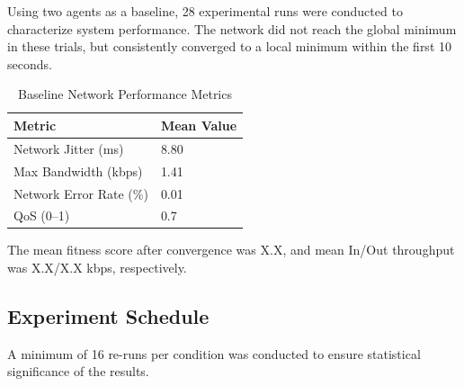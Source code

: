 \documentclass[conference]{IEEEtran}
\begin{document}
Using two agents as a baseline, 28 experimental runs were conducted to characterize system performance. The network did not reach the global minimum in these trials, but consistently converged to a local minimum within the first 10 seconds.

\begin{table}[H]
  \centering
  \caption{Baseline Network Performance Metrics}
  \label{tab:baseline_network_metrics}
  \begin{tabular}{ll}
  \toprule
  \textbf{Metric} & \textbf{Mean Value} \\
  \midrule
  Network Jitter (ms)      & 8.80  \\
  Max Bandwidth (kbps)     & 1.41  \\
  Network Error Rate (\%)  & 0.01  \\
  QoS (0--1)               & 0.7   \\
  \bottomrule
  \end{tabular}
\end{table}

The mean fitness score after convergence was X.X, and mean In/Out throughput was X.X/X.X kbps, respectively.

\subsection{Experiment Schedule}\label{sec:experiments-schedule}

A minimum of 16 re-runs per condition was conducted to ensure statistical significance of the results.
\end{document}
